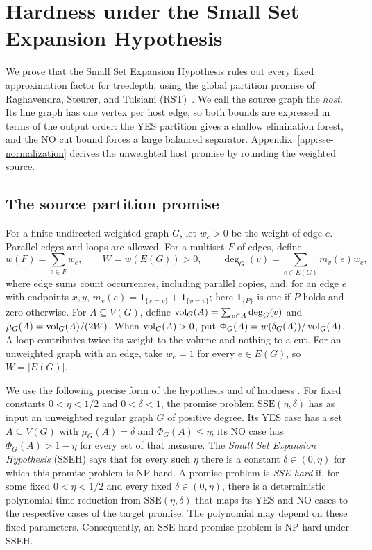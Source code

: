 \section{Hardness under the Small Set Expansion Hypothesis}
\label{sec:sseh}

We prove that the Small Set Expansion Hypothesis rules out every fixed
approximation factor for treedepth, using the global partition promise
of Raghavendra, Steurer, and Tulsiani (RST)~\cite{RST}. We call the
source graph the \emph{host}. Its line graph has one vertex per host
edge, so both bounds are expressed in terms of the output order: the
YES partition gives a shallow elimination forest, and the NO cut
bound forces a large balanced separator.
Appendix~\ref{app:sse-normalization} derives the unweighted host
promise by rounding the weighted source.

\subsection{The source partition promise}

For a finite undirected weighted graph $G$, let
$w_e>0$ be the weight of edge $e$. Parallel edges
and loops are allowed. For a multiset $F$ of edges, define
\[
 w(F)=\sum_{e\in F}w_e,\qquad W=w(E(G))>0,\qquad
 \deg_G(v)=\sum_{e\in E(G)}m_v(e)w_e,
\]
where edge sums count occurrences, including parallel copies, and,
for an edge $e$ with endpoints $x,y$,
$m_v(e)=\mathbf1_{\{x=v\}}+\mathbf1_{\{y=v\}}$; here
$\mathbf1_{\{P\}}$ is one if $P$ holds and zero otherwise.
For $A\subseteq V(G)$, define $\operatorname{vol}_G(A)=\sum_{v\in A}\deg_G(v)$ and
$\mu_G(A)=\operatorname{vol}_G(A)/(2W)$. When $\operatorname{vol}_G(A)>0$, put
$\Phi_G(A)=w(\delta_G(A))/\operatorname{vol}_G(A)$. A loop contributes
twice its weight to the volume and nothing to a cut.
For an unweighted graph with an edge, take $w_e=1$ for every $e\in E(G)$,
so $W=|E(G)|$.

We use the following precise form of the hypothesis and of hardness
\cite[Hypothesis~5.4 and Definition~5.6]{RST}. For fixed constants
$0<\eta<1/2$ and $0<\delta<1$, the promise problem
$\mathrm{SSE}(\eta,\delta)$ has as input an unweighted regular graph
$G$ of positive degree. Its YES case has a set $A\subseteq V(G)$ with
$\mu_G(A)=\delta$ and $\Phi_G(A)\leq\eta$; its NO case has
$\Phi_G(A)>1-\eta$ for every set of that measure. The
\emph{Small Set Expansion Hypothesis} (SSEH) says that for every such $\eta$
there is a constant $\delta\in(0,\eta)$ for which this promise problem
is NP-hard. A promise problem is \emph{SSE-hard} if, for some fixed
$0<\eta<1/2$ and every fixed $\delta\in(0,\eta)$, there is a deterministic
polynomial-time reduction from $\mathrm{SSE}(\eta,\delta)$ that maps
its YES and NO cases to the respective cases of the target promise.
The polynomial may depend on these fixed parameters. Consequently,
an SSE-hard promise problem is NP-hard under SSEH.

